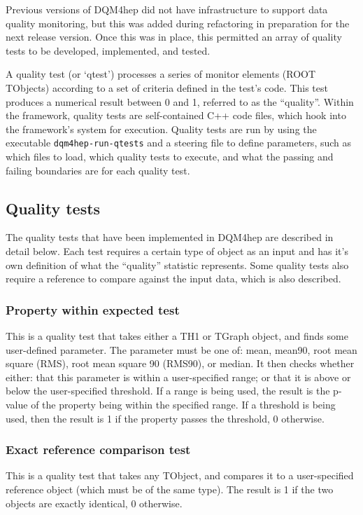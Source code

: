 Previous versions of \acrshort{DQM4hep} did not have infrastructure to support data quality monitoring, but this was added during refactoring in preparation for the next release version. Once this was in place, this permitted an array of quality tests to be developed, implemented, and tested. 

A quality test (or `qtest') processes a series of monitor elements (ROOT TObjects) according to a set of criteria defined in the test's code. This test produces a numerical result between 0 and 1, referred to as the ``quality''. Within the framework, quality tests are self-contained C++ code files, which hook into the framework's system for execution. Quality tests are run by using the executable \texttt{dqm4hep-run-qtests} and a steering file to define parameters, such as which files to load, which quality tests to execute, and what the passing and failing boundaries are for each quality test. 

\subsection{Quality tests}
The quality tests that have been implemented in \acrshort{DQM4hep} are described in detail below. Each test requires a certain type of object as an input and has it's own definition of what the ``quality'' statistic represents. Some quality tests also require a reference to compare against the input data, which is also described.

\subsubsection{Property within expected test}
This is a quality test that takes either a TH1 or TGraph object, and finds some user-defined parameter. The parameter must be one of: mean, mean90, root mean square (RMS), root mean square 90 (RMS90), or median. It then checks whether either: that this parameter is within a user-specified range; or that it is above or below the user-specified threshold. If a range is being used, the result is the p-value of the property being within the specified range. If a threshold is being used, then the result is 1 if the property passes the threshold, 0 otherwise.

\subsubsection{Exact reference comparison test}
This is a quality test that takes any TObject, and compares it to a user-specified reference object (which must be of the same type). The result is 1 if the two objects are exactly identical, 0 otherwise. 

